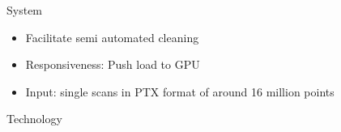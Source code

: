 \documentclass{beamer}
\begin{document}
\begin{frame}{System}
  \begin{itemize}
\item Facilitate semi automated cleaning
\item Responsiveness: Push load to GPU
\item Input: single scans in PTX format of around 16 million points
\end{itemize}

\end{frame}

\begin{frame}{Technology}
  \setlength\fboxsep{5pt}
  \setlength\fboxrule{0.0pt}


\end{frame}
\end{document}
